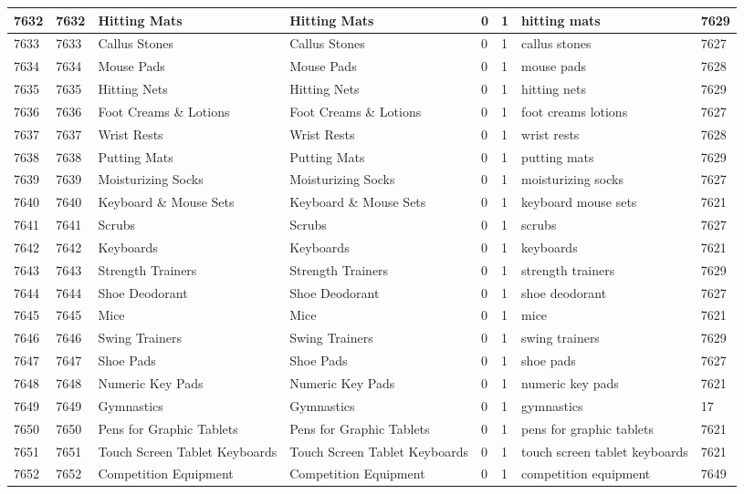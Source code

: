 \begin{longtable}{|l|l|l|l|l|l|l|l|}
7632 & 7632 & Hitting Mats & Hitting Mats & 0 & 1 & hitting mats & 7629 \\ \hline 
7633 & 7633 & Callus Stones & Callus Stones & 0 & 1 & callus stones & 7627 \\ \hline 
7634 & 7634 & Mouse Pads & Mouse Pads & 0 & 1 & mouse pads & 7628 \\ \hline 
7635 & 7635 & Hitting Nets & Hitting Nets & 0 & 1 & hitting nets & 7629 \\ \hline 
7636 & 7636 & Foot Creams \& Lotions & Foot Creams \& Lotions & 0 & 1 & foot creams lotions & 7627 \\ \hline 
7637 & 7637 & Wrist Rests & Wrist Rests & 0 & 1 & wrist rests & 7628 \\ \hline 
7638 & 7638 & Putting Mats & Putting Mats & 0 & 1 & putting mats & 7629 \\ \hline 
7639 & 7639 & Moisturizing Socks & Moisturizing Socks & 0 & 1 & moisturizing socks & 7627 \\ \hline 
7640 & 7640 & Keyboard \& Mouse Sets & Keyboard \& Mouse Sets & 0 & 1 & keyboard mouse sets & 7621 \\ \hline 
7641 & 7641 & Scrubs & Scrubs & 0 & 1 & scrubs & 7627 \\ \hline 
7642 & 7642 & Keyboards & Keyboards & 0 & 1 & keyboards & 7621 \\ \hline 
7643 & 7643 & Strength Trainers & Strength Trainers & 0 & 1 & strength trainers & 7629 \\ \hline 
7644 & 7644 & Shoe Deodorant & Shoe Deodorant & 0 & 1 & shoe deodorant & 7627 \\ \hline 
7645 & 7645 & Mice & Mice & 0 & 1 & mice & 7621 \\ \hline 
7646 & 7646 & Swing Trainers & Swing Trainers & 0 & 1 & swing trainers & 7629 \\ \hline 
7647 & 7647 & Shoe Pads & Shoe Pads & 0 & 1 & shoe pads & 7627 \\ \hline 
7648 & 7648 & Numeric Key Pads & Numeric Key Pads & 0 & 1 & numeric key pads & 7621 \\ \hline 
7649 & 7649 & Gymnastics & Gymnastics & 0 & 1 & gymnastics & 17 \\ \hline 
7650 & 7650 & Pens for Graphic Tablets & Pens for Graphic Tablets & 0 & 1 & pens for graphic tablets & 7621 \\ \hline 
7651 & 7651 & Touch Screen Tablet Keyboards & Touch Screen Tablet Keyboards & 0 & 1 & touch screen tablet keyboards & 7621 \\ \hline 
7652 & 7652 & Competition Equipment & Competition Equipment & 0 & 1 & competition equipment & 7649 \\ \hline 

\end{longtable}
